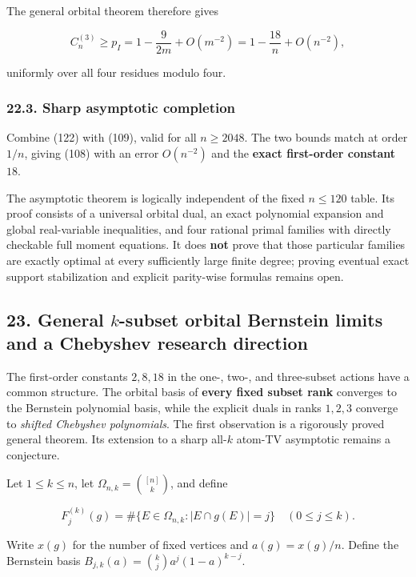 \documentclass[
  11pt,
]{article}
\begin{document}
The general orbital theorem therefore gives

\[
C_n^{(3)}\ge p_I
=1-\frac{9}{2m}+O(m^{-2})
=1-\frac{18}{n}+O(n^{-2}),
\tag{122}
\]

uniformly over all four residues modulo four.

\subsubsection{22.3. Sharp asymptotic
completion}\label{sharp-asymptotic-completion}

Combine (122) with (109), valid for all \(n\ge2048\). The two bounds
match at order \(1/n\), giving (108) with an error \(O(n^{-2})\) and the
\textbf{exact first-order constant \(18\)}.

The asymptotic theorem is logically independent of the fixed \(n\le120\)
table. Its proof consists of a universal orbital dual, an exact
polynomial expansion and global real-variable inequalities, and four
rational primal families with directly checkable full moment equations.
It does \textbf{not} prove that those particular families are exactly
optimal at every sufficiently large finite degree; proving eventual
exact support stabilization and explicit parity-wise formulas remains
open.

\subsection{\texorpdfstring{23. General \(k\)-subset orbital Bernstein
limits and a Chebyshev research
direction}{23. General k-subset orbital Bernstein limits and a Chebyshev research direction}}\label{general-k-subset-orbital-bernstein-limits-and-a-chebyshev-research-direction}

The first-order constants \(2,8,18\) in the one-, two-, and three-subset
actions have a common structure. The orbital basis of \textbf{every
fixed subset rank} converges to the Bernstein polynomial basis, while
the explicit duals in ranks \(1,2,3\) converge to \emph{shifted
Chebyshev polynomials}. The first observation is a rigorously proved
general theorem. Its extension to a sharp all-\(k\) atom-TV asymptotic
remains a conjecture.

Let \(1\le k\le n\), let \(\Omega_{n,k}=\binom{[n]}k\), and define

\[
F_j^{(k)}(g)
=\#\{E\in\Omega_{n,k}:|E\cap g(E)|=j\}
\quad(0\le j\le k).
\]

Write \(x(g)\) for the number of fixed vertices and \(a(g)=x(g)/n\).
Define the Bernstein basis \(B_{j,k}(a)=\binom kj a^j(1-a)^{k-j}\).
\end{document}
